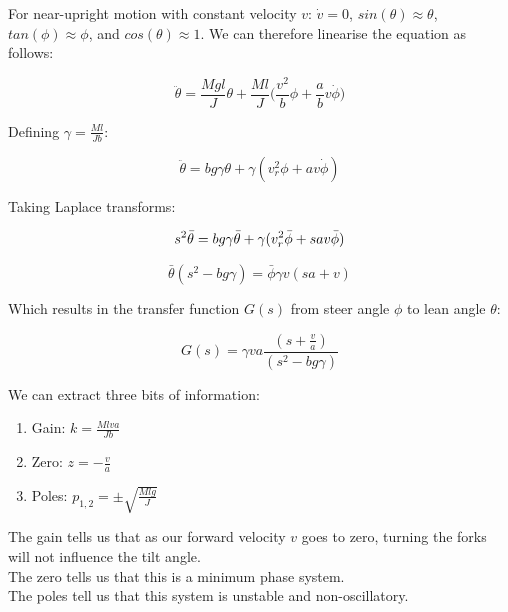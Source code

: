\documentclass[a4paper]{article}
\begin{document}
\noindent For near-upright motion with constant velocity $v$: $\dot{v} = 0$, $sin(\theta) \approx \theta$, $tan(\phi) \approx \phi$, and $cos(\theta) \approx 1$. We can therefore linearise the equation as follows:

\begin{equation}
\ddot{\theta} = \frac{Mgl}{J} \theta + \frac{Ml}{J} \Big( \frac{v^2}{b} \phi + \frac{a}{b} v \dot{\phi} \Big)
\end{equation}

\noindent Defining $\gamma = \frac{Ml}{Jb}$:

\begin{equation*}
\ddot{\theta} = b g \gamma \theta + \gamma (v^2_r \phi + a v \dot{\phi})
\end{equation*}

\noindent Taking Laplace transforms:

\begin{equation*}
s^2 \bar{\theta} = b g \gamma \bar{\theta} + \gamma (v^2_r \bar{\phi} + s a v \bar{\phi}) \\
\end{equation*}

\begin{equation*}
\bar{\theta} (s^2 - b g \gamma) = \bar{\phi} \gamma v (s a + v) 
\end{equation*}

\noindent Which results in the transfer function $G(s)$ from steer angle $\phi$ to lean angle $\theta$:

\begin{equation}
G(s) = \gamma v a \frac{(s + \frac{v}{a})}{(s^2 - b g \gamma)}
\end{equation}

\noindent We can extract three bits of information:

\begin{enumerate}
\item Gain: $k = \frac{M l v a}{J b}$
\item Zero: $z = -\frac{v}{a}$
\item Poles: $p_{1,2} = \pm \sqrt{\frac{M l g}{J}}$
\end{enumerate}

\noindent The gain tells us that as our forward velocity $v$ goes to zero, turning the forks will not influence the tilt angle. \\
The zero tells us that this is a minimum phase system. \\
The poles tell us that this system is unstable and non-oscillatory. \\
\end{document}
